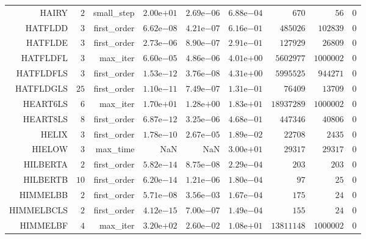 \begin{longtable}{rrrrrrrrr}
HAIRY & \(     2\) & small\_step & \( 2.00\)e\(+01\) & \( 2.69\)e\(-06\) & \( 6.88\)e\(-04\) & \(   670\) & \(    56\) & \(     0\) \\
HATFLDD & \(     3\) & first\_order & \( 6.62\)e\(-08\) & \( 4.21\)e\(-07\) & \( 6.16\)e\(-01\) & \(485026\) & \(102839\) & \(     0\) \\
HATFLDE & \(     3\) & first\_order & \( 2.73\)e\(-06\) & \( 8.90\)e\(-07\) & \( 2.91\)e\(-01\) & \(127929\) & \( 26809\) & \(     0\) \\
HATFLDFL & \(     3\) & max\_iter & \( 6.60\)e\(-05\) & \( 4.86\)e\(-06\) & \( 4.01\)e\(+00\) & \(5602977\) & \(1000002\) & \(     0\) \\
HATFLDFLS & \(     3\) & first\_order & \( 1.53\)e\(-12\) & \( 3.76\)e\(-08\) & \( 4.31\)e\(+00\) & \(5995525\) & \(944271\) & \(     0\) \\
HATFLDGLS & \(    25\) & first\_order & \( 1.10\)e\(-11\) & \( 7.49\)e\(-07\) & \( 1.31\)e\(-01\) & \( 76409\) & \( 13709\) & \(     0\) \\
HEART6LS & \(     6\) & max\_iter & \( 1.70\)e\(+01\) & \( 1.28\)e\(+00\) & \( 1.83\)e\(+01\) & \(18937289\) & \(1000002\) & \(     0\) \\
HEART8LS & \(     8\) & first\_order & \( 6.87\)e\(-12\) & \( 3.25\)e\(-06\) & \( 4.68\)e\(-01\) & \(447346\) & \( 40806\) & \(     0\) \\
HELIX & \(     3\) & first\_order & \( 1.78\)e\(-10\) & \( 2.67\)e\(-05\) & \( 1.89\)e\(-02\) & \( 22708\) & \(  2435\) & \(     0\) \\
HIELOW & \(     3\) & max\_time &       NaN &       NaN & \( 3.00\)e\(+01\) & \( 29317\) & \( 29317\) & \(     0\) \\
HILBERTA & \(     2\) & first\_order & \( 5.82\)e\(-14\) & \( 8.75\)e\(-08\) & \( 2.29\)e\(-04\) & \(   203\) & \(   203\) & \(     0\) \\
HILBERTB & \(    10\) & first\_order & \( 6.20\)e\(-14\) & \( 1.21\)e\(-06\) & \( 1.80\)e\(-04\) & \(    97\) & \(    25\) & \(     0\) \\
HIMMELBB & \(     2\) & first\_order & \( 5.71\)e\(-08\) & \( 3.56\)e\(-03\) & \( 1.67\)e\(-04\) & \(   175\) & \(    24\) & \(     0\) \\
HIMMELBCLS & \(     2\) & first\_order & \( 4.12\)e\(-15\) & \( 7.00\)e\(-07\) & \( 1.49\)e\(-04\) & \(   155\) & \(    24\) & \(     0\) \\
HIMMELBF & \(     4\) & max\_iter & \( 3.20\)e\(+02\) & \( 2.60\)e\(-02\) & \( 1.08\)e\(+01\) & \(13811148\) & \(1000002\) & \(     0\) \\

\end{longtable}
